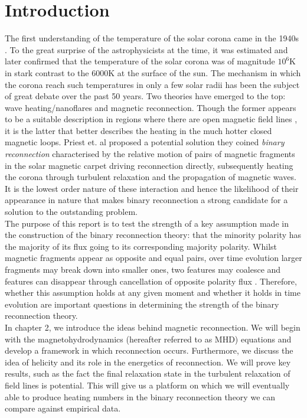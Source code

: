 \setcounter{equation}{0}
\chapter{Introduction}

The first understanding of the temperature of the solar corona came in the 1940s \cite{aschwanden}. To the great surprise of the astrophysicists at the time, it was estimated and later confirmed that the temperature of the solar corona was of magnitude $10^6 \text{K}$ in stark contrast to the $6000 \text{K}$ at the surface of the sun. The mechanism in which the corona reach such temperatures in only a few solar radii has been the subject of great debate over the past 50 years. Two theories have emerged to the top: wave heating/nanoflares and magnetic reconnection. Though the former appears to be a suitable description in regions where there are open magnetic field lines \cite{arnab}, it is the latter that better describes the heating in the much hotter closed magnetic loops. Priest et. al \cite{priest} proposed a potential solution they coined \textit{binary reconnection} characterised by the relative motion of pairs of magnetic fragments in the solar magnetic carpet driving reconnection directly, subsequently heating the corona through turbulent relaxation and the propagation of magnetic waves. It is the lowest order nature of these interaction and hence the likelihood of their appearance in nature that makes binary reconnection a strong candidate for a solution to the outstanding problem. \\
The purpose of this report is to test the strength of a key assumption made in the construction of the binary reconnection theory: that the minority polarity has the majority of its flux going to its corresponding majority polarity. Whilst magnetic fragments appear as opposite and equal pairs, over time evolution larger fragments may break down into smaller ones, two features may coalesce and features can disappear through cancellation of opposite polarity flux \cite{meyer}. Therefore, whether this assumption holds at any given moment and whether it holds in time evolution are important questions in determining the strength of the binary reconnection theory.\\
In chapter 2, we introduce the ideas behind magnetic reconnection. We will begin with the magnetohydrodynamics (hereafter referred to as MHD) equations and develop a framework in which reconnection occurs. Furthermore, we discuss the idea of helicity and its role in the energetics of reconnection. We will prove key results, such as the fact the final relaxation state in the turbulent relaxation of field lines is potential. This will give us a platform on which we will eventually able to produce heating numbers in the binary reconnection theory we can compare against empirical data. \\
